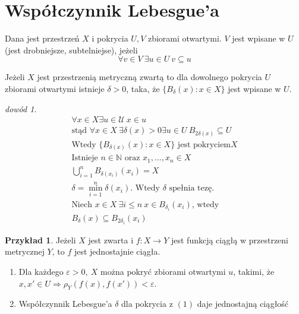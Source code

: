 \documentclass[twoside,10pt]{article}
\theoremstyle{definition}
\theoremstyle{definition}
\theoremstyle{definition}
\theoremstyle{definition}
\theoremstyle{remark}
\newtheorem*{dd}{dowód}
\theoremstyle{definition}
\theoremstyle{definition}
\theoremstyle{definition}
\theoremstyle{definition}
\newtheorem*{prz}{Przykład}
\theoremstyle{definition}
\theoremstyle{definition}
\begin{document}
\section{Współczynnik Lebesgue'a}
\begin{df} 
    Dana jest przestrzeń $X$ i pokrycia $U, V$ zbiorami otwartymi. $V$ jest wpisane w $U$ (jest drobniejsze, 
    subtelniejse), jeżeli 
    \[ \forall v \in V \ \exists u \in U \ v \subseteq u \]
\end{df} 
\begin{tw} 
    Jeżeli $X$ jest przestrzenią metryczną zwartą to dla dowolnego pokrycia $U$ zbiorami otwartymi 
    istnieje $\delta > 0$, taka, że $\{ B_\delta(x) : x \in X\}$ jest wpisane w $U$. 
\end{tw} 
\begin{dd} 
    \begin{gather*}
        \forall x \in X \exists u \in \mathcal{U} \ x \in u \\ 
        \text{stąd } \forall x \in X \ \exists \delta (x) > 0 \exists u \in U \ B_{2\delta (x)} \subseteq U \\
        \text{Wtedy } \{ B_{\delta (x)} (x) : x \in X \} \text{ jest pokryciem} X \\
        \text{Istnieje } n \in \mathbb{N} \text{ oraz } x_1,\ldots,x_n \in X \\ 
        \bigcup_{i=1}^n B_{\delta (x_i)} (x_i) = X \\ 
        \delta = \min_{i=1}^n \delta(x_i). \text{ Wtedy } \delta \text{ spełnia tezę}. \\ 
        \text{Niech } x \in X \ \exists i \le n \ x \in B_{\delta_i} (x_i) \text{, wtedy} \\ 
        B_\delta (x) \subseteq B_{2\delta_i} (x_i)
    \end{gather*} 
\end{dd} 
\begin{prz} 
    Jeżeli $X$ jest zwarta i $f : X \to Y$ jest funkcją ciągłą w przestrzeni metrycznej $Y$, to $f$ 
    jest jednostajnie ciągła. 
    \begin{enumerate}[(1)]
        \item Dla każdego $\varepsilon > 0, \ X $ można pokryć zbiorami otwartymi $u$, takimi, że $x,x' \in U 
            \Rightarrow \rho_Y (f(x),f(x')) < \varepsilon$.
        \item Współczynnik Lebesgue'a $\delta$ dla pokrycia z $(1)$ daje jednostajną ciągłość
    \end{enumerate} 
\end{prz}
\end{document}
